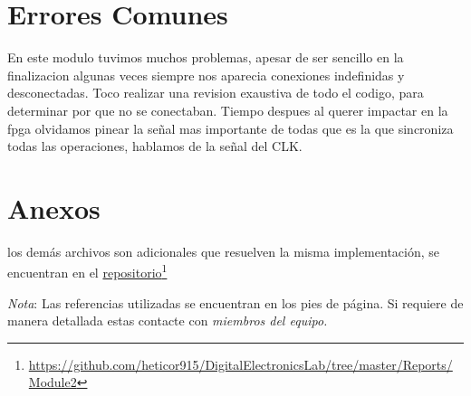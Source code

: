 \documentclass[paper=a4, fontsize=12pt]{article} 		%
\newcommand\fnurl[2]{%
\href{#2}{#1}\footnote{\url{#2}}%
}
\numberwithin{equation}{section}						%
\numberwithin{table}{section} 							%
\begin{document}
\section{Errores Comunes}
En este modulo tuvimos muchos problemas, apesar de ser sencillo en la finalizacion algunas veces siempre nos aparecia conexiones indefinidas y desconectadas. Toco realizar una revision exaustiva de todo el codigo, para determinar por que no se conectaban.
Tiempo despues al querer impactar en la fpga olvidamos pinear la señal mas importante de todas que es la que sincroniza todas las operaciones, hablamos de la señal del CLK. 
\section{Anexos}
los demás archivos son adicionales que resuelven la misma implementación, se encuentran en el \fnurl{repositorio}{https://github.com/heticor915/DigitalElectronicsLab/tree/master/Reports/Module2}
\textit{Nota}: Las referencias utilizadas se encuentran en los pies de página. Si requiere de manera detallada estas contacte con \emph{miembros del equipo.}
\end{document}
